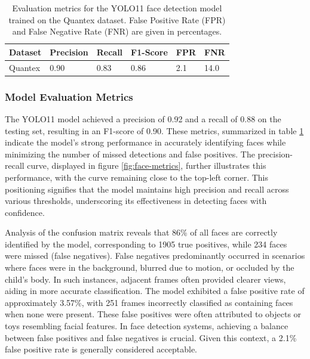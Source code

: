 \documentclass[
  man,floatsintext]{apa6}
\begin{document}
\begin{table}[tbp]

\begin{center}
\begin{threeparttable}

\caption{\label{tab:face-detection-metrics-detailed}Evaluation metrics for the YOLO11 face detection model trained on the Quantex dataset. False Positive Rate (FPR) and False Negative Rate (FNR) are given in percentages.}

\begin{tabular}{llllll}
\toprule
Dataset & \multicolumn{1}{c}{Precision} & \multicolumn{1}{c}{Recall} & \multicolumn{1}{c}{F1-Score} & \multicolumn{1}{c}{FPR} & \multicolumn{1}{c}{FNR}\\
\midrule
Quantex & 0.90 & 0.83 & 0.86 & 2.1 & 14.0\\
\bottomrule
\end{tabular}

\end{threeparttable}
\end{center}

\end{table}

\subsubsection{Model Evaluation Metrics}\label{model-evaluation-metrics-1}

The YOLO11 model achieved a precision of 0.92 and a recall of 0.88 on the testing set, resulting in an F1-score of 0.90. These metrics, summarized in table \ref{tab:face-detection-metrics-detailed} indicate the model's strong performance in accurately identifying faces while minimizing the number of missed detections and false positives. The precision-recall curve, displayed in figure \ref{fig:face-metrics}, further illustrates this performance, with the curve remaining close to the top-left corner. This positioning signifies that the model maintains high precision and recall across various thresholds, underscoring its effectiveness in detecting faces with confidence.

Analysis of the confusion matrix reveals that 86\% of all faces are correctly identified by the model, corresponding to 1905 true positives, while 234 faces were missed (false negatives). False negatives predominantly occurred in scenarios where faces were in the background, blurred due to motion, or occluded by the child's body. In such instances, adjacent frames often provided clearer views, aiding in more accurate classification. The model exhibited a false positive rate of approximately 3.57\%, with 251 frames incorrectly classified as containing faces when none were present. These false positives were often attributed to objects or toys resembling facial features. In face detection systems, achieving a balance between false positives and false negatives is crucial. Given this context, a 2.1\% false positive rate is generally considered acceptable.
\end{document}
